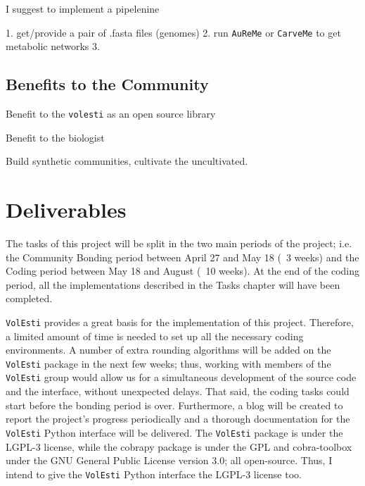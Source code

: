 \documentclass{article}
\begin{document}
I suggest to implement a pipelenine 

1. get/provide a pair of .fasta files (genomes)
2. run \texttt{AuReMe} or \texttt{CarveMe} to get metabolic networks
3. 




\subsection{Benefits to the Community}

Benefit to the \texttt{volesti} as an open source library

Benefit to the biologist 


Build synthetic communities, cultivate the uncultivated. 

\section{Deliverables}


The tasks of this project will be split in the two main periods of the project; i.e. the Community Bonding period between April 27 and May 18 (~3 weeks) and the Coding period between May 18 and August (~10 weeks). 
At the end of the coding period, all the implementations described in the Tasks chapter will have been completed. 

\texttt{VolEsti} provides a great basis for the implementation of this project. 
Therefore, a limited amount of time is needed  to set up all the necessary coding environments. 
A number of extra rounding algorithms will be added on the \texttt{VolEsti} package in the next few weeks; thus, working with members of the \texttt{VolEsti} group would allow us for a simultaneous  development of the source code and the interface, without unexpected delays. That said, the coding tasks could start before the bonding period is over. 
Furthermore, a blog will be created to report the project’s progress periodically and a thorough documentation for the \texttt{VolEsti} Python interface will be delivered. The \texttt{VolEsti} package is under the LGPL-3 license, while the cobrapy package is under the GPL and cobra-toolbox under the GNU General Public License version 3.0; all open-source. Thus, I intend to give the  \texttt{VolEsti} Python interface the LGPL-3 license too. 
\end{document}
